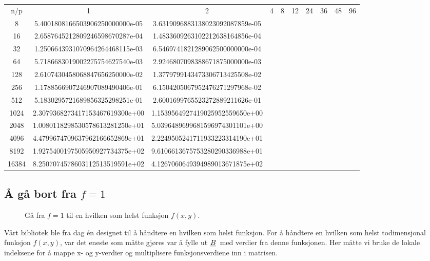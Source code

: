 \documentclass{article}
\newcommand{\ub}[1]{\underbar{$#1$}\,}
\begin{document}
\begin{table}
\begin{tabular}{c | c c c c c c c c c}

n/p & 1 & 2 & 4 & 8 & 12 & 24 & 36 & 48 & 96 \\
8 &	5.4001808166503906250000000e-05 & 3.6319096883138023092087859e-05 \\
16 &    2.6587645212809246598670287e-04 & 1.4833609263102212638164856e-04 \\
32 &    1.2506643931070964264468115e-03 & 6.5469741821289062500000000e-04 \\
64 &    5.7186683019002275754627540e-03 & 2.9246807098388671875000000e-03 \\
128 &   2.6107430458068847656250000e-02 & 1.3779799143473306713425508e-02 \\
256 &   1.1788566907246907089490406e-01 & 6.1504205067952476271297968e-02 \\
512 &   5.1830295721689856325298251e-01 & 2.6001699765523272889211626e-01 \\
1024 &  2.3079368273417153467619300e+00 & 1.1539564927419025952559650e+00 \\
2048 &  1.0080118298530578613281250e+01 & 5.0396489699681596974301101e+00 \\
4096 &	4.4799674709637962166652869e+01 & 2.2249505241711933223314190e+01 \\
8192 &	1.9275400197505950927734375e+02 & 9.6106613675753280290336988e+01 \\
16384 &	8.2507074578603112513519591e+02 & 4.1267060649394989013671875e+02 \\











\end{tabular}
\end{table}

\subsection{Å gå bort fra $f=1$}
\begin{figure}[h]
	\centering
	
	\caption{Gå fra $f=1$ til en hvilken som helst funksjon $f(x, y)$.}
	\label{fig:setitimer}
\end{figure}
Vårt bibliotek ble fra dag én designet til å håndtere en hvilken som helst funksjon. For å håndtere en hvilken som helst todimensjonal funksjon $f(x, y)$, var det eneste som måtte gjøres var å fylle ut $\ub{B}$ med verdier fra denne funksjonen. Her måtte vi bruke de lokale indeksene for å mappe x- og y-verdier og multiplisere funksjonsverdiene inn i matrisen.
\end{document}
